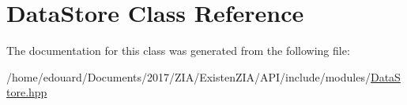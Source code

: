 \hypertarget{classDataStore}{}\section{Data\+Store Class Reference}
\label{classDataStore}


The documentation for this class was generated from the following file\+:\begin{DoxyCompactItemize}
\item 
/home/edouard/\+Documents/2017/\+Z\+I\+A/\+Existen\+Z\+I\+A/\+A\+P\+I/include/modules/\mbox{\hyperlink{DataStore_8hpp}{Data\+Store.\+hpp}}\end{DoxyCompactItemize}
